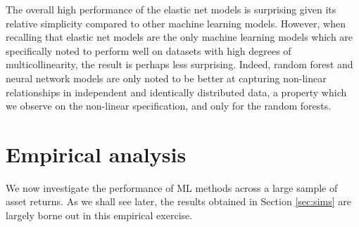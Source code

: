 \documentclass{article}
\begin{document}

 The overall high performance of the elastic net models is surprising given its relative simplicity compared to other machine learning models. However, when recalling that elastic net models are the only machine learning models which are specifically noted to perform well on datasets with high degrees of multicollinearity, the result is perhaps less surprising. Indeed, random forest and neural network models are only noted to be better at capturing non-linear relationships in independent and identically distributed data, a property which we observe on the non-linear specification, and only for the random forests.


\section{Empirical analysis}\label{sec:emp}
We now investigate the performance of ML methods across a large sample of asset returns. As we shall see later, the results obtained in Section \ref{sec:sims} are largely borne out in this empirical exercise. 
\end{document}
